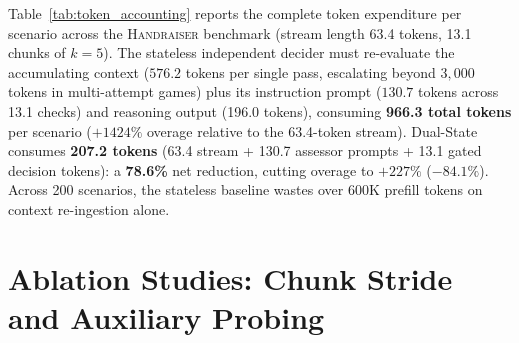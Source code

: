 \documentclass{article}
\begin{document}
Table~\ref{tab:token_accounting} reports the complete token expenditure per scenario across the \textsc{Handraiser} benchmark (stream length 63.4 tokens, 13.1 chunks of $k=5$). The stateless independent decider must re-evaluate the accumulating context ($576.2$ tokens per single pass, escalating beyond $3{,}000$ tokens in multi-attempt games) plus its instruction prompt ($130.7$ tokens across 13.1 checks) and reasoning output (196.0 tokens), consuming \textbf{966.3 total tokens} per scenario ($+1424\%$ overage relative to the 63.4-token stream). Dual-State consumes \textbf{207.2 tokens} (63.4 stream + 130.7 assessor prompts + 13.1 gated decision tokens): a \textbf{78.6\%} net reduction, cutting overage to $+227\%$ ($-84.1\%$). Across 200 scenarios, the stateless baseline wastes over 600K prefill tokens on context re-ingestion alone.

\begin{table}[h]
\centering
\caption{\textbf{Token accounting breakdown per scenario (\textsc{Handraiser}, 200 scenarios).}}
\label{tab:token_accounting}
\vspace{0.2cm}
\end{table}

\section{Ablation Studies: Chunk Stride and Auxiliary Probing}
\label{app:probes}
\end{document}
